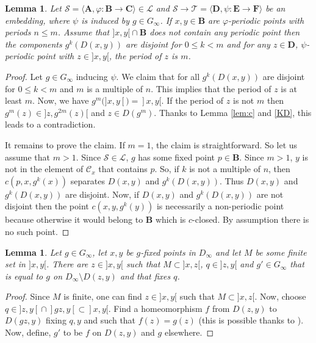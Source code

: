 \documentclass[JEP,XML,SOM,Unicode,NoFloatCountersInSection]{cedram}
\let\mathcal\mathscr
\theoremstyle{plain}
\newtheorem{lem}[thm]{Lemma}
\theoremstyle{definition}
\newcommand{\bA}{{\boldsymbol{A}}}
\newcommand{\bB}{{\boldsymbol{B}}}
\newcommand{\bC}{{\boldsymbol{C}}}
\newcommand{\bD}{{\boldsymbol{D}}}
\newcommand{\bE}{{\boldsymbol{E}}}
\newcommand{\bF}{{\boldsymbol{F}}}
\newcommand{\cC}{\mathcal{C}}
\newcommand{\cL}{\mathcal{L}}
\newcommand{\cS}{\mathcal{S}}
\newcommand{\cT}{\mathcal{T}}
\begin{document}
\begin{lem}\label{period} Let $\cS=\langle \bA,\varphi\colon\bB\to\bC\rangle\in\cL$ and $\cS\to \cT=\langle \bD,\psi\colon \bE\to\bF\rangle$ be an embedding, where $\psi$ is induced by $g\in G_\infty$. If $x,y\in\bB$ are $\varphi$-periodic points with periods $n\leq m$. Assume that $]x,y[{}\cap\bB$ does not contain any periodic point then the components $g^k(D(x,y))$ are disjoint for $0\leq k<m$ and for any $z\in \bD$, $\psi$-periodic point with $z\in{}]x,y[$, the period of $z$ is $m$.
\end{lem}

\begin{proof} Let $g\in G_\infty$ inducing $\psi$. We claim that for all $g^k(D(x,y))$ are disjoint for $0\leq k<m$ and $m$ is a multiple of $n$. This implies that the period of $z$ is at least $m$. Now, we have $g^m(]x,y[)=]x,y[$. If the period of $z$ is not $m$ then $g^m(z)\in{}]z,g^{2m}(z)[$ and $z\in D(g^m)$. Thanks to Lemma \ref{lem:c} and \ref{KD}, this leads to a contradiction.

It remains to prove the claim. If $m=1$, the claim is straightforward. So let us assume that $m>1$. Since $\cS\in\cL$, $g$ has some fixed point $p\in\bB$. Since $m>1$, $y$ is not in the element of $\cC_x$ that contains $p$. So, if $k$ is not a multiple of $n$, then $c(p,x,g^k(x))$ separates $D(x,y)$ and $g^k(D(x,y))$. Thus $D(x,y)$ and $g^k(D(x,y))$ are disjoint. Now, if $D(x,y)$ and $g^k(D(x,y))$ are not disjoint then the point $c(x,y,g^k(y))$ is necessarily a non-periodic point because otherwise it would belong to $\bB$ which is $c$-closed. By assumption there is no such point.
\end{proof}

\begin{lem}\label{lem:fix}Let $g\in G_\infty$, let $x,y$ be $g$-fixed points in $D_\infty$ and let $M$ be some finite set in $]x,y[$. There are $z\in{}]x,y[$ such that $M\subset]x,z[$, $q\in{}]z,y[$ and $g'\in G_\infty$ that is equal to $g$ on $D_\infty\setminus D(z,y)$ and that fixes $q$.
\end{lem}

\begin{proof}Since $M$ is finite, one can find $z\in{}]x,y[$ such that $M\subset]x,z[$. Now, choose $q\in{}]z,y[{}\cap{}]gz,y[{}\subset]x,y[$. Find a homeomorphism $f$ from $D(z,y)$ to $D(gz,y)$ fixing $q,y$ and such that $f(z)=g(z)$ (this is possible thanks to \cite[Prop.\,6.1]{DM_dendritesII}). Now, define, $g'$ to be $f$ on $D(z,y)$ and $g$ elsewhere.
\end{proof}
\end{document}
